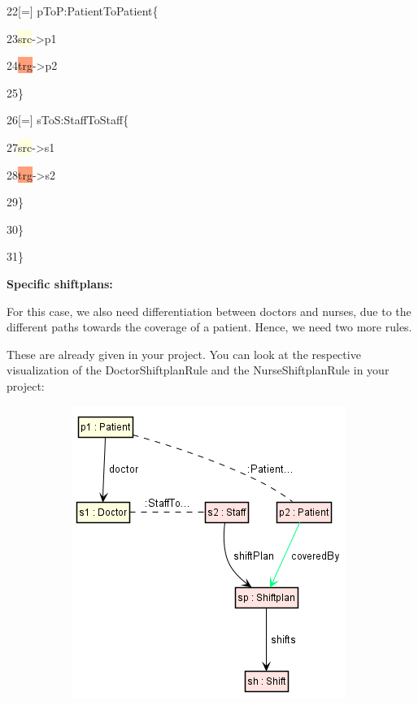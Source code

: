{{	22\hspace{1cm}[=] pToP:PatientToPatient\{
				
	23\hspace{1.5cm}\colorbox{LightYellow}{src}->p1
				
	24\hspace{1.5cm}\colorbox{LightSalmon}{trg}->p2
				
	25\hspace{1cm}\}
				
	26\hspace{1cm}[=] sToS:StaffToStaff\{
				
	27\hspace{1.5cm}\colorbox{LightYellow}{src}->s1
				
	28\hspace{1.5cm}\colorbox{LightSalmon}{trg}->s2
				
	29\hspace{1cm}\}
				
	30\hspace{0.5cm}\}
				
	31\hspace{0.5cm}\}


}

\textbf{Specific shiftplans:}

For this case, we also need differentiation between doctors and nurses, due to the different paths towards the coverage of a patient. Hence, we need two more rules.

These are already given in your project. You can look at the respective visualization of the \textsf{DoctorShiftplanRule} and the \textsf{NurseShiftplanRule} in your project: \newline

\begin{figure}[h]
    \centering
    
    \begin{subfigure}[b]{0.3\textwidth}
    
    \includegraphics[scale=0.45 ]{pictures/DocShiftplanRule.png}
    \caption{}
    \label{DocShiftplanRule}
    

\end{subfigure}
\end{figure}}
